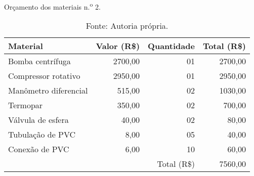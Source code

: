 \begin{table}[htb]%
\caption{Orçamento dos materiais n.\textsuperscript{o} 2.}%
\label{tab:tab4}%
\begin{tabularx}{\textwidth}{@{\extracolsep{\fill}}lrrr}%
\toprule
Material              & \multicolumn{1}{c}{Valor (R\$)} & \multicolumn{1}{c}{Quantidade}  & \multicolumn{1}{c}{Total (R\$)} \\ \midrule
Bomba centrífuga      & 2700,00                         & 01                              & 2700,00                         \\
Compressor rotativo   & 2950,00                         & 01                              & 2950,00                         \\
Manômetro diferencial & 515,00                          & 02                              & 1030,00                         \\
Termopar              & 350,00                          & 02                              & 700,00                          \\
Válvula de esfera     & 40,00                           & 02                              & 80,00                           \\
Tubulação de PVC      & 8,00                            & 05                              & 40,00                           \\
Conexão de PVC        & 6,00                            & 10                              & 60,00                           \\ \midrule
                      &                                 & \multicolumn{1}{r}{Total (R\$)} & 7560,00                         \\ \bottomrule
\end{tabularx}
\caption*{Fonte: Autoria própria.}%
\end{table}

